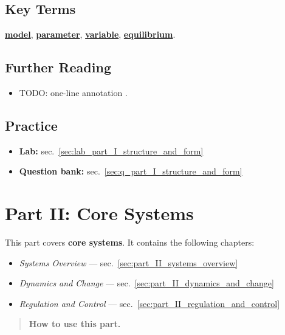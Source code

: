 \documentclass[
]{article}
\providecommand{\tightlist}{%
  \setlength{\itemsep}{0pt}\setlength{\parskip}{0pt}}
\theoremstyle{plain}
\theoremstyle{definition}
\begin{document}
\subsection{Key Terms}\label{key-terms-5}

\hyperref[gl:model]{\textbf{model}},
\hyperref[gl:parameter]{\textbf{parameter}},
\hyperref[gl:variable]{\textbf{variable}},
\hyperref[gl:equilibrium]{\textbf{equilibrium}}.

\subsection{Further Reading}\label{further-reading-5}

\begin{itemize}
\item
  TODO: one-line annotation \citep{patel2018models}.
\end{itemize}

\subsection{Practice}\label{practice-5}

\begin{itemize}
\tightlist
\item
  \textbf{Lab:} sec.~\ref{sec:lab_part_I_structure_and_form}
\item
  \textbf{Question bank:} sec.~\ref{sec:q_part_I_structure_and_form}
\end{itemize}

\newpage

\section{Part II: Core Systems}\label{sec:part_II_intro}

This part covers \textbf{core systems}. It contains the following
chapters:

\begin{itemize}
\tightlist
\item
  \emph{Systems Overview} --- sec.~\ref{sec:part_II_systems_overview}
\item
  \emph{Dynamics and Change} ---
  sec.~\ref{sec:part_II_dynamics_and_change}
\item
  \emph{Regulation and Control} ---
  sec.~\ref{sec:part_II_regulation_and_control}
\end{itemize}

\begin{quote}
\textbf{How to use this part.}
\end{quote}
\end{document}
